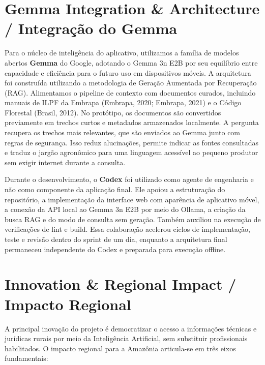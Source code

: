 \documentclass[12pt,a4paper]{article}
\begin{document}
\section{Gemma Integration \& Architecture / Integração do Gemma}

Para o núcleo de inteligência do aplicativo, utilizamos a família de modelos abertos \textbf{Gemma} do Google, adotando o Gemma 3n E2B por seu equilíbrio entre capacidade e eficiência para o futuro uso em dispositivos móveis. A arquitetura foi construída utilizando a metodologia de Geração Aumentada por Recuperação (RAG). Alimentamos o pipeline de contexto com documentos curados, incluindo manuais de ILPF da Embrapa (Embrapa, 2020; Embrapa, 2021) e o Código Florestal (Brasil, 2012). No protótipo, os documentos são convertidos previamente em trechos curtos e metadados armazenados localmente. A pergunta recupera os trechos mais relevantes, que são enviados ao Gemma junto com regras de segurança. Isso reduz alucinações, permite indicar as fontes consultadas e traduz o jargão agronômico para uma linguagem acessível ao pequeno produtor sem exigir internet durante a consulta.

Durante o desenvolvimento, o \textbf{Codex} foi utilizado como agente de engenharia e não como componente da aplicação final. Ele apoiou a estruturação do repositório, a implementação da interface web com aparência de aplicativo móvel, a conexão da API local ao Gemma 3n E2B por meio do Ollama, a criação da busca RAG e do modo de consulta sem geração. Também auxiliou na execução de verificações de lint e build. Essa colaboração acelerou ciclos de implementação, teste e revisão dentro do sprint de um dia, enquanto a arquitetura final permaneceu independente do Codex e preparada para execução offline.

\section{Innovation \& Regional Impact / Impacto Regional}

A principal inovação do projeto é democratizar o acesso a informações técnicas e jurídicas rurais por meio da Inteligência Artificial, sem substituir profissionais habilitados. O impacto regional para a Amazônia articula-se em três eixos fundamentais:
\end{document}
